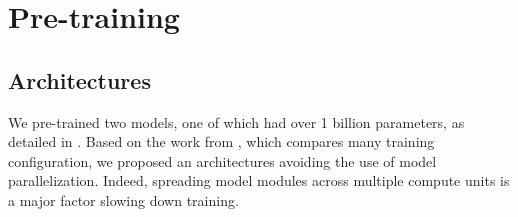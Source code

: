 

\section{Pre-training}







\subsection{Architectures} 

We pre-trained two models, one of which had over 1 billion parameters, as detailed in . Based on the work from \textcite{shoeybi_19}, which compares many training configuration, we proposed an architectures avoiding the use of model parallelization. Indeed, spreading model modules across multiple compute units is a major factor slowing down training.

